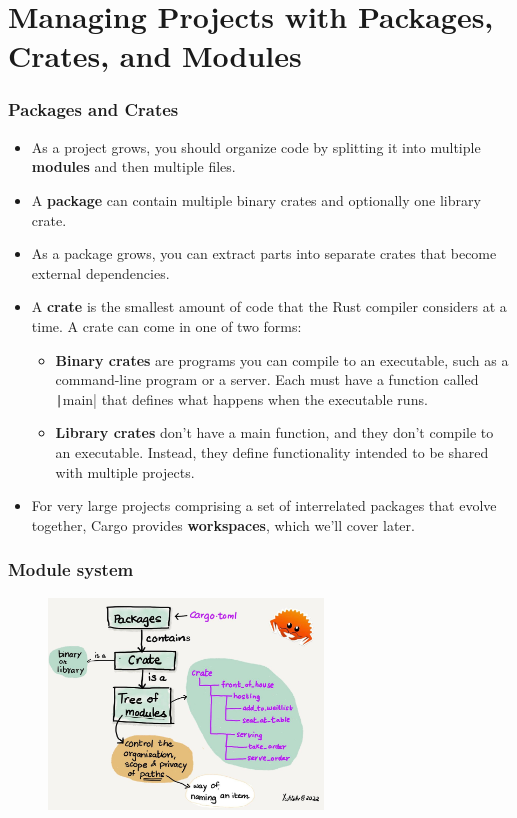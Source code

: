 \documentclass{beamer}
\begin{document}
\section{Managing Projects with Packages, Crates, and Modules}
\begin{frame}[fragile]
	\frametitle{Packages and Crates}
	\begin{itemize}
		\item As a project grows, you should organize code by splitting it into multiple \textbf{modules} and then multiple files. 
		\item 	A \textbf{package} can contain multiple binary crates and optionally one library crate. 
		\item 	As a package grows, you can extract parts into separate crates that become external dependencies.
		\item 	A \textbf{crate} is the smallest amount of code that the Rust compiler considers at a time. A crate can come in one of two forms: 
		\begin{itemize}
			\item \textbf{Binary crates }are programs you can compile to an executable, such as a command-line program or a server. Each must have a function called \texttt|main| that defines what happens when the executable runs. 
			\item 	\textbf{Library crates} don’t have a main function, and they don’t compile to an executable. Instead, they define functionality intended to be shared with multiple projects.
		\end{itemize}
		
		\item 	For very large projects comprising a set of interrelated packages that evolve together, Cargo provides \textbf{workspaces}, which we’ll cover later.
	\end{itemize}
\end{frame}

\begin{frame}[fragile]
	\frametitle{Module system}
	\begin{figure}
		\centering
		\includegraphics[width=0.65\textwidth]{./img/package.jpeg}
	\end{figure}
\end{frame}
\end{document}
